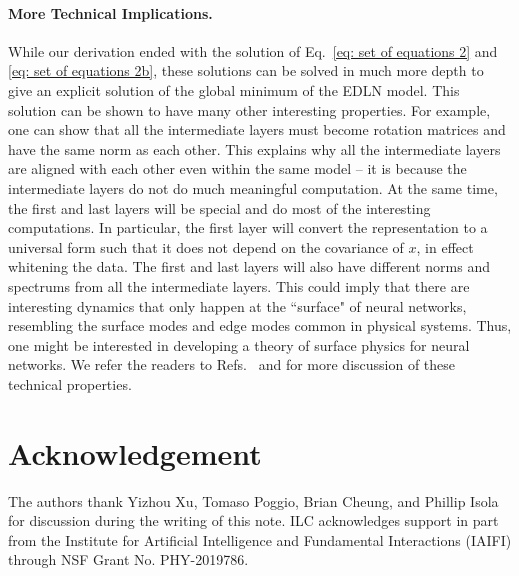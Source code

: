 \documentclass[11pt]{article}
\theoremstyle{plain}
\begin{document}
\vspace{-1mm}
\paragraph{More Technical Implications.} While our derivation ended with the solution of Eq.~\eqref{eq: set of equations 2} and \eqref{eq: set of equations 2b}, these solutions can be solved in much more depth to give an explicit solution of the global minimum of the EDLN model. This solution can be shown to have many other interesting properties. For example, one can show that all the intermediate layers must become rotation matrices and have the same norm as each other. This explains why all the intermediate layers are aligned with each other even within the same model -- it is because the intermediate layers do not do much meaningful computation. At the same time, the first and last layers will be special and do most of the interesting computations. In particular, the first layer will convert the representation to a universal form such that it does not depend on the covariance of $x$, in effect whitening the data. The first and last layers will also have different norms and spectrums from all the intermediate layers. This could imply that there are interesting dynamics that only happen at the ``surface" of neural networks, resembling the surface modes and edge modes common in physical systems. Thus, one might be interested in developing a theory of surface physics for neural networks. We refer the readers to Refs.~\cite{ziyin2024parameter} and \cite{ziyin2025neural} for more discussion of these technical properties.


\section*{Acknowledgement} 

The authors thank Yizhou Xu, Tomaso Poggio, Brian Cheung, and Phillip Isola for discussion during the writing of this note. ILC acknowledges support in part from the Institute for Artificial Intelligence and Fundamental Interactions (IAIFI) through NSF Grant No. PHY-2019786. %



\end{document}
